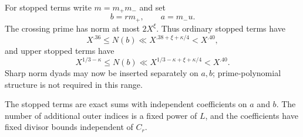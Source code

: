 For stopped terms write $m=m_+m_-$ and set
\[
 b=rm_+,\qquad a=m_-u.
\]
The crossing prime has norm at most $2X^\xi$.  Thus ordinary stopped
terms have
\[
 X^{.36}\le N(b)\ll X^{.38+\xi+\kappa/4}<X^{.40},
\]
and upper stopped terms have
\[
 X^{1/3-\kappa}\le N(b)
 \ll X^{1/3-\kappa+\xi+\kappa/4}<X^{.40}.
\]
Sharp norm dyads may now be inserted separately on $a,b$; prime-polynomial
structure is not required in this range.

\begin{lemma}
\label{lem:stopping-separation}
The stopped terms are exact sums with independent coefficients on
$a$ and $b$.  The number of additional outer indices is a fixed
power of $L$, and the coefficients have fixed divisor bounds
independent of $C_r$.
\end{lemma}

